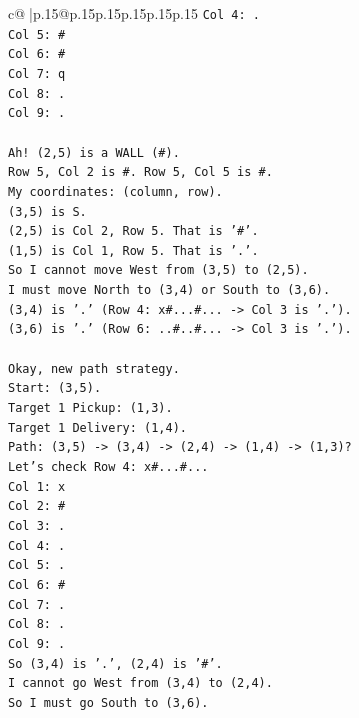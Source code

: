 \documentclass{article}
\begin{document}
{\begin{supertabular}{c@{$\;$}|p{.15\linewidth}@{}p{.15\linewidth}p{.15\linewidth}p{.15\linewidth}p{.15\linewidth}p{.15\linewidth}}
{{{\texttt{Col 4: .} \\
\texttt{Col 5: \#} \\
\texttt{Col 6: \#} \\
\texttt{Col 7: q} \\
\texttt{Col 8: .} \\
\texttt{Col 9: .} \\
\\ 
\texttt{Ah! (2,5) is a WALL (\#).} \\
\texttt{Row 5, Col 2 is \#. Row 5, Col 5 is \#.} \\
\texttt{My coordinates: (column, row).} \\
\texttt{(3,5) is S.} \\
\texttt{(2,5) is Col 2, Row 5. That is '\#'.} \\
\texttt{(1,5) is Col 1, Row 5. That is '.'.} \\
\texttt{So I cannot move West from (3,5) to (2,5).} \\
\texttt{I must move North to (3,4) or South to (3,6).} \\
\texttt{(3,4) is '.' (Row 4: x\#...\#... {-}> Col 3 is '.').} \\
\texttt{(3,6) is '.' (Row 6: ..\#..\#... {-}> Col 3 is '.').} \\
\\ 
\texttt{Okay, new path strategy.} \\
\texttt{Start: (3,5).} \\
\texttt{Target 1 Pickup: (1,3).} \\
\texttt{Target 1 Delivery: (1,4).} \\
\texttt{Path: (3,5) {-}> (3,4) {-}> (2,4) {-}> (1,4) {-}> (1,3)?} \\
\texttt{Let's check Row 4: x\#...\#...} \\
\texttt{Col 1: x} \\
\texttt{Col 2: \#} \\
\texttt{Col 3: .} \\
\texttt{Col 4: .} \\
\texttt{Col 5: .} \\
\texttt{Col 6: \#} \\
\texttt{Col 7: .} \\
\texttt{Col 8: .} \\
\texttt{Col 9: .} \\
\texttt{So (3,4) is '.', (2,4) is '\#'.} \\
\texttt{I cannot go West from (3,4) to (2,4).} \\
\texttt{So I must go South to (3,6).} \\
}}}
\end{supertabular}}
\end{document}
